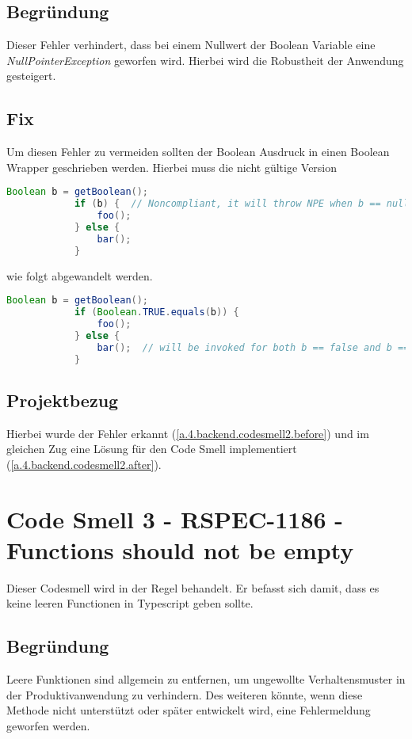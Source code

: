 		\subsection{Begründung}
		Dieser Fehler verhindert, dass bei einem Nullwert der Boolean Variable eine \textit{NullPointerException} geworfen wird. Hierbei wird die Robustheit der Anwendung gesteigert.
		
		\subsection{Fix}
		Um diesen Fehler zu vermeiden sollten der Boolean Ausdruck in einen Boolean Wrapper geschrieben werden. Hierbei muss die nicht gültige Version 
		
		\begin{lstlisting}[language=java,caption={Non Complient Version - Codesmell 1},gobble=11]
			Boolean b = getBoolean();
			if (b) {  // Noncompliant, it will throw NPE when b == null
				foo();
			} else {
				bar();
			}
		\end{lstlisting}
	
		wie folgt abgewandelt werden.
	
		\begin{lstlisting}[language=java,caption={Complient Version - Codesmell 1},gobble=11]
			Boolean b = getBoolean();
			if (Boolean.TRUE.equals(b)) {
				foo();
			} else {
				bar();  // will be invoked for both b == false and b == null
			}
		\end{lstlisting}
	
		\subsection{Projektbezug}
		Hierbei wurde der Fehler erkannt (\cref{a.4.backend.codesmell2.before}) und im gleichen Zug eine Lösung für den Code Smell implementiert (\cref{a.4.backend.codesmell2.after}).
		
	
	\section{Code Smell 3 - RSPEC-1186 - Functions should not be empty \cite{codeSmell3.sonar}}
	Dieser Codesmell wird in der Regel  behandelt. Er befasst sich damit, dass es keine leeren Functionen in Typescript geben sollte.
		\subsection{Begründung}
		Leere Funktionen sind allgemein zu entfernen, um ungewollte Verhaltensmuster in der Produktivanwendung zu verhindern. Des weiteren könnte, wenn diese Methode nicht unterstützt oder später entwickelt wird, eine Fehlermeldung geworfen werden. 
		
